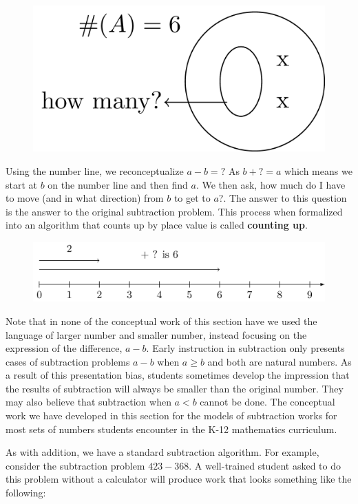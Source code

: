\documentclass[
]{book}
\theoremstyle{definition}
\theoremstyle{definition}
\theoremstyle{definition}
\theoremstyle{remark}
\begin{document}
\begin{figure}

{\centering \includegraphics[width=0.4\linewidth]{tikz/subtraction-model-missingaddend-set} 

}

\end{figure}

Using the number line, we reconceptualize \(a-b=?\) As \(b+?=a\) which means we start at \(b\) on the number line and then find \(a\). We then ask, how much do I have to move (and in what direction) from \(b\) to get to \(a\)?. The answer to this question is the answer to the original subtraction problem. This process when formalized into an algorithm that counts up by place value is called \textbf{counting up}.

\begin{figure}

{\centering \includegraphics[width=0.8\linewidth]{tikz/subtraction-model-missingaddend-numberline} 

}

\end{figure}

Note that in none of the conceptual work of this section have we used the language of larger number and smaller number, instead focusing on the expression of the difference, \(a-b\). Early instruction in subtraction only presents cases of subtraction problems \(a-b\) when \(a\geq b\) and both are natural numbers. As a result of this presentation bias, students sometimes develop the impression that the results of subtraction will always be smaller than the original number. They may also believe that subtraction when \(a<b\) cannot be done. The conceptual work we have developed in this section for the models of subtraction works for most sets of numbers students encounter in the K-12 mathematics curriculum.

As with addition, we have a standard subtraction algorithm. For example, consider the subtraction problem \(423-368\). A well-trained student asked to do this problem without a calculator will produce work that looks something like the following:
\end{document}
